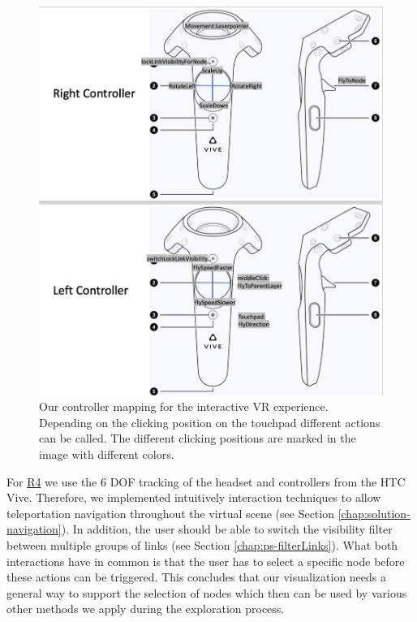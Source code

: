 \begin{figure}[b]
    \centering
    \includegraphics[width=1\textwidth]{graphics/controllerMapping.jpg}
    \caption[Our controller mapping for the interactive VR experience.]{Our controller mapping for the interactive VR experience. Depending on the clicking position on the touchpad different actions can be called. The different clicking positions are marked in the image with different colors.} 
    \label{fig:controllerMapping} 
\end{figure}
For \hyperref[req:R4]{R4} we use the 6 DOF tracking of the headset and controllers from the HTC Vive. Therefore, we implemented intuitively interaction techniques to allow teleportation navigation throughout the virtual scene (see Section \ref{chap:solution-navigation}). In addition, the user should be able  to switch the visibility filter between multiple groups of links (see Section \ref{chap:ps-filterLinks}).
What both interactions have in common is that the user has to select a specific node before these actions can be triggered. 
This concludes that our visualization needs a general way to support the selection of nodes which then can be used by various other methods we apply during the exploration process. 
